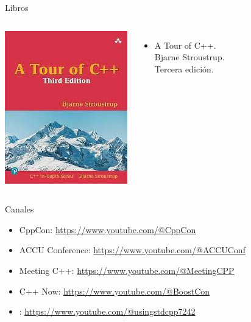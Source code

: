 \begin{frame}[t]{Libros}
\begin{columns}
\includegraphics[height=.3\textheight]{img/tour-cpp.jpg}
\begin{itemize}
\item A Tour of C++.\\
      Bjarne Stroustrup.\\
      Tercera edición.
\end{itemize}
\end{columns}
\end{frame}

\begin{frame}[t]{Canales}
\begin{itemize}
  \item CppCon: \url{https://www.youtube.com/@CppCon}

  \vfill
  \item ACCU Conference: \url{https://www.youtube.com/@ACCUConf}

  \vfill
  \item Meeting C++: \url{https://www.youtube.com/@MeetingCPP}

  \vfill
  \item C++ Now: \url{https://www.youtube.com/@BoostCon}

  \vfill
  \item {}: \url{https://www.youtube.com/@usingstdcpp7242}
\end{itemize}
\end{frame}
